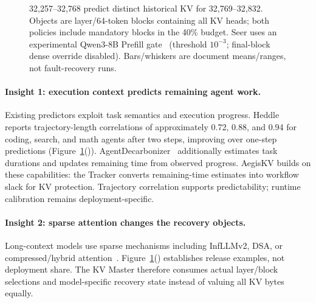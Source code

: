 \begin{figure}[t]
{    32,257--32,768 predict distinct historical KV for 32,769--32,832.
    Objects are layer/64-token blocks containing all KV heads; both
    policies include mandatory blocks in the 40\% budget.
    Seer uses an experimental Qwen3-8B Prefill gate~\cite{song2026seerqwen3}
    (threshold $10^{-3}$; final-block dense override disabled).
    Bars/whiskers are document means/ranges, not fault-recovery runs.}
  \label{fig:design-insights}
\end{figure}

\paragraph{Insight 1: execution context predicts remaining agent work.}
Existing predictors exploit task semantics and execution progress.
Heddle~\cite{zhang2026heddle} reports trajectory-length correlations of
approximately 0.72, 0.88, and 0.94 for coding, search, and math agents
after two steps, improving over one-step predictions
(Figure~\ref{fig:design-insights}()).
AgentDecarbonizer~\cite{yan2026agentdecarbonizer} additionally estimates
task durations and updates remaining time from observed progress.
AegisKV builds on these capabilities: the Tracker converts remaining-time
estimates into workflow slack for KV protection. Trajectory correlation
supports predictability; runtime calibration remains deployment-specific.

\paragraph{Insight 2: sparse attention changes the recovery objects.}
Long-context models use sparse mechanisms including InfLLMv2,
DSA, or compressed/hybrid attention~\cite{minicpm4model,
openbmb2025minicpm41,deepseek2025v32exp,deepseek2025v32model,
zai2026glm5model,openbmb2026sala,deepseek2026v4model,minimax2026m3,
zai2026glm52,longcat2026sparse}.
Figure~\ref{fig:design-insights}()
establishes release examples, not deployment share.
The KV Master therefore consumes actual layer/block selections and
model-specific recovery state instead of valuing all KV bytes equally.

